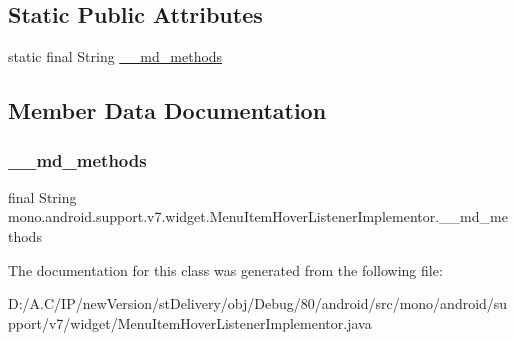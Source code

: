 \subsection*{Static Public Attributes}
\begin{DoxyCompactItemize}
\item 
static final String \hyperlink{classmono_1_1android_1_1support_1_1v7_1_1widget_1_1_menu_item_hover_listener_implementor_a73a796ddc43d5f81a5967a791026a58b}{\+\_\+\+\_\+md\+\_\+methods}
\end{DoxyCompactItemize}


\subsection{Member Data Documentation}
\mbox{\label{classmono_1_1android_1_1support_1_1v7_1_1widget_1_1_menu_item_hover_listener_implementor_a73a796ddc43d5f81a5967a791026a58b}} 
\subsubsection{\texorpdfstring{\+\_\+\+\_\+md\+\_\+methods}{\_\_md\_methods}}
{\footnotesize\ttfamily final String mono.\+android.\+support.\+v7.\+widget.\+Menu\+Item\+Hover\+Listener\+Implementor.\+\_\+\+\_\+md\+\_\+methods\hspace{0.3cm}{\ttfamily [static]}}



The documentation for this class was generated from the following file\+:\begin{DoxyCompactItemize}
\item 
D\+:/\+A.\+C/\+I\+P/new\+Version/st\+Delivery/obj/\+Debug/80/android/src/mono/android/support/v7/widget/Menu\+Item\+Hover\+Listener\+Implementor.\+java\end{DoxyCompactItemize}
